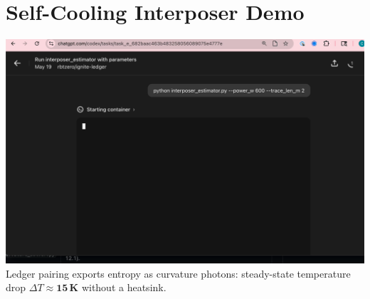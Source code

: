 \documentclass{article}\pagestyle{empty}\usepackage{graphicx}
\begin{document}
\section*{Self-Cooling Interposer Demo}
\includegraphics[width=\linewidth]{still.png}
\bigskip\noindent
Ledger pairing exports entropy as curvature photons: steady-state
temperature drop $\Delta T \approx \mathbf{15\,K}$ without a heatsink.
\end{document}
